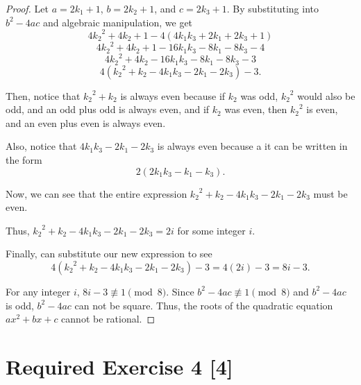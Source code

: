 \documentclass{article}
\begin{document}
\begin{enumerate}
{\begin{proof}
            Let \(a = 2k_1 + 1\), \(b = 2k_2 + 1\), and \(c = 2k_3 + 1\).
            By substituting into \(b^2 - 4ac\) and algebraic manipulation, we get 
            \[4{k_2}^2 + 4k_2 + 1 - 4(4k_1k_3 + 2k_1 + 2k_3 + 1)\]
            \[4{k_2}^2 + 4k_2 + 1 - 16k_1k_3 -8k_1 - 8k_3 - 4\]
            \[4{k_2}^2 + 4k_2 - 16k_1k_3 -8k_1 - 8k_3 - 3\]
            \[4 ({k_2}^2 + k_2 - 4k_1k_3 - 2k_1 - 2k_3) - 3.\]
            
            Then, notice that \({k_2}^2 + k_2\) is always even because if 
            \(k_2\) was odd, \({k_2}^2\) would also be odd, and an odd plus odd
            is always even, and if \(k_2\) was even, then \({k_2}^2\) is even,
            and an even plus even is always even.

            Also, notice that \(4k_1k_3 -2k_1 -2k_3\) is always even because
            a it can be written in the form 
            \[2(2k_1k_3 - k_1 -k_3).\]

            Now, we can see that the entire expression \({k_2}^2 + k_2 - 4k_1k_3 - 2k_1 - 2k_3\)
            must be even. 
            
            Thus, \({k_2}^2 + k_2 - 4k_1k_3 - 2k_1 - 2k_3 = 2i\) 
            for some integer \(i\).

            Finally, can substitute our new expression to see
            \[4 ({k_2}^2 + k_2 - 4k_1k_3 - 2k_1 - 2k_3) - 3 = 4 (2i) - 3 = 8i - 3.\]

            For any integer \(i\), \(8i -3 \not\equiv 1 \pmod{8}\). 
            Since \(b^2 - 4ac \not\equiv 1 \pmod{8}\) and \(b^2 -4ac\) is odd, 
            \(b^2 - 4ac\) can not be square. Thus, the roots of the quadratic
            equation \(ax^2 + bx + c\) cannot be rational.

        \end{proof}

    }
\end{enumerate}

\section*{Required Exercise 4 [4]}
\end{document}
